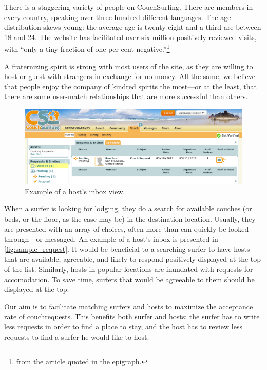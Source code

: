 There is a staggering variety of people on CouchSurfing.
There are members in every country, speaking over three hundred different languages.
The age distribution skews young: the average age is twenty-eight and a third are between 18 and 24.
The website has facilitated over six million positively-reviewed visits, with ``only a tiny fraction of one per cent negative.''\footnote{from the article quoted in the epigraph.}

A fraternizing spirit is strong with most users of the site, as they are willing to host or guest with strangers in exchange for no money.
All the same, we believe that people enjoy the company of kindred spirits the most---or at the least, that there are some user-match relationships that are more successful than others.

\begin{figure}[ht]
\centering
\includegraphics[width=1\linewidth]{figures/screenshots/requests.png}
\caption{Example of a host's inbox view.}
\label{fig:sample_request}
\end{figure}

When a surfer is looking for lodging, they do a search for available couches (or beds, or the floor, as the case may be) in the destination location.
Usually, they are presented with an array of choices, often more than can quickly be looked through---or messaged.
An example of a host's inbox is presented in \autoref{fig:sample_request}.
It would be beneficial to a searching surfer to have hosts that are available, agreeable, and likely to respond positively displayed at the top of the list.
Similarly, hosts in popular locations are inundated with requests for accomodation.
To save time, surfers that would be agreeable to them should be displayed at the top.

Our aim is to facilitate matching surfers and hosts to maximize the acceptance rate of couchrequests. This benefits both surfer and hosts: the surfer has to write less requests in order to find a place to stay, and the host has to review less requests to find a surfer he would like to host.

